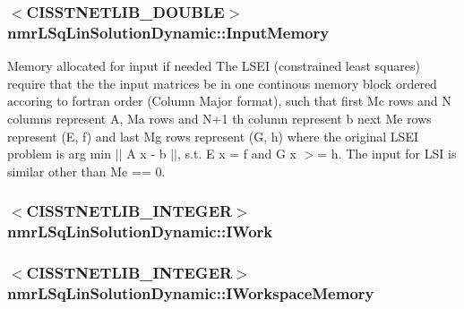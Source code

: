 \subsubsection[{Input\+Memory}]{$<$C\+I\+S\+S\+T\+N\+E\+T\+L\+I\+B\+\_\+\+D\+O\+U\+B\+L\+E$>$ nmr\+L\+Sq\+Lin\+Solution\+Dynamic\+::\+Input\+Memory\hspace{0.3cm}{\ttfamily [protected]}}\label{classnmr_l_sq_lin_solution_dynamic_abcfb3ce4549a3ac8926ca94a071fa61f}
Memory allocated for input if needed The L\+S\+E\+I (constrained least squares) require that the the input matrices be in one continous memory block ordered accoring to fortran order (Column Major format), such that first Mc rows and N columns represent A, Ma rows and N+1 th column represent b next Me rows represent (E, f) and last Mg rows represent (G, h) where the original L\+S\+E\+I problem is arg min $\vert$$\vert$ A x -\/ b $\vert$$\vert$, s.\+t. E x = f and G x $>$= h. The input for L\+S\+I is similar other than Me == 0. \hypertarget{classnmr_l_sq_lin_solution_dynamic_a19d6282ccc51cf567872e789d8c29596}{}
\subsubsection[{I\+Work}]{$<$C\+I\+S\+S\+T\+N\+E\+T\+L\+I\+B\+\_\+\+I\+N\+T\+E\+G\+E\+R$>$ nmr\+L\+Sq\+Lin\+Solution\+Dynamic\+::\+I\+Work\hspace{0.3cm}{\ttfamily [protected]}}\label{classnmr_l_sq_lin_solution_dynamic_a19d6282ccc51cf567872e789d8c29596}
\hypertarget{classnmr_l_sq_lin_solution_dynamic_a5d42d35b6d178d1cdfc61c15af11a512}{}
\subsubsection[{I\+Workspace\+Memory}]{$<$C\+I\+S\+S\+T\+N\+E\+T\+L\+I\+B\+\_\+\+I\+N\+T\+E\+G\+E\+R$>$ nmr\+L\+Sq\+Lin\+Solution\+Dynamic\+::\+I\+Workspace\+Memory\hspace{0.3cm}{\ttfamily [protected]}}\label{classnmr_l_sq_lin_solution_dynamic_a5d42d35b6d178d1cdfc61c15af11a512}
\hypertarget{classnmr_l_sq_lin_solution_dynamic_a9bfadf22c69040131bce764301e97ce6}{}
